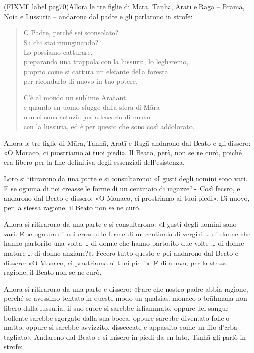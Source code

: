 (FIXME label pag70)Allora le tre figlie di Māra, Taṇhā, Aratī e Ragā – Brama, Noia e
Lussuria – andarono dal padre e gli parlarono in strofe:


\begin{quote}
O Padre, perché sei sconsolato? \\
Su chi stai rimuginando? \\
Lo possiamo catturare, \\
preparando una trappola con la lussuria, lo legheremo, \\
proprio come si cattura un elefante della foresta, \\
per ricondurlo di nuovo in tuo potere.


C’è al mondo un sublime Arahant, \\
e quando un uomo sfugge dalla sfera di Māra \\
non ci sono astuzie per adescarlo di nuovo \\
con la lussuria, ed è per questo che sono così addolorato.
\end{quote}

Allora le tre figlie di Māra, Taṇhā, Aratī e Ragā andarono dal Beato e
gli dissero: «O Monaco, ci prostriamo ai tuoi piedi». Il Beato, però,
non se ne curò, poiché era libero per la fine definitiva degli
essenziali dell’esistenza.


Loro si ritirarono da una parte e si consultarono: «I gusti degli uomini
sono vari. E se ognuna di noi creasse le forme di un centinaio di
ragazze?». Così fecero, e andarono dal Beato e dissero: «O Monaco, ci
prostriamo ai tuoi piedi». Di nuovo, per la stessa ragione, il Beato non
se ne curò.


Allora si ritirarono da una parte e si consultarono: «I gusti degli
uomini sono vari. E se ognuna di noi creasse le forme di un centinaio di
vergini …​ di donne che hanno partorito una volta …​ di donne che
hanno partorito due volte …​ di donne mature …​ di donne anziane?».
Fecero tutto questo e poi andarono dal Beato e dissero: «O Monaco, ci
prostriamo ai tuoi piedi». E di nuovo, per la stessa ragione, il Beato
non se ne curò.


Allora si ritirarono da una parte e dissero: «Pare che nostro padre
abbia ragione, perché se avessimo tentato in questo modo un qualsiasi
monaco o brāhmaṇa non libero dalla lussuria, il suo cuore si sarebbe
infiammato, oppure del sangue bollente sarebbe sgorgato dalla sua bocca,
oppure sarebbe diventato folle o matto, oppure si sarebbe avvizzito,
disseccato e appassito come un filo d’erba tagliato». Andarono dal Beato
e si misero in piedi da un lato. Taṇhā gli parlò in strofe:


